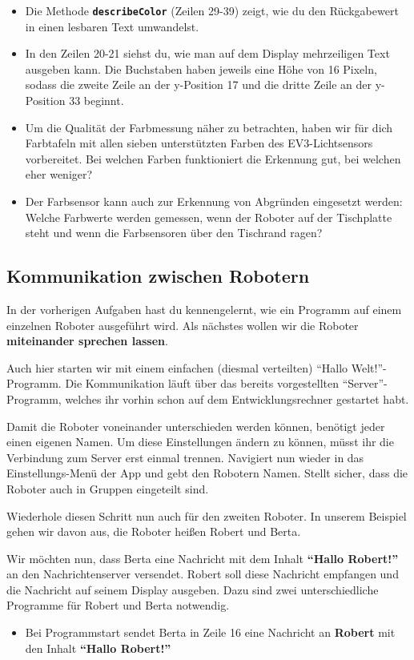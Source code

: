 \documentclass[
	12pt,
	colorbacktitle,
	accentcolor=tud1c,
	draft,
	twoside,
	german
]{tudexercise}
\newcommand{\solpath}[0]{../../impl/androidApp/app/src/main/java/org/mindroid/android/app/programs/workshop/solutions}
\newcommand{\bfcode}[1]{\texttt{\textbf{#1}}}
\begin{document}
	
	
	\begin{itemize}
	\item Die Methode \bfcode{describeColor} (Zeilen 29-39) zeigt, wie du den Rückgabewert in einen lesbaren Text umwandelst.
	\item In den Zeilen 20-21 siehst du, wie man auf dem Display mehrzeiligen Text ausgeben kann. Die Buchstaben haben jeweils eine Höhe von 16 Pixeln, sodass die zweite Zeile an der y-Position 17 und die dritte Zeile an der y-Position 33 beginnt.
	\item Um die Qualität der Farbmessung näher zu betrachten, haben wir für dich Farbtafeln mit allen sieben unterstützten Farben des EV3-Lichtsensors vorbereitet. Bei welchen Farben funktioniert die Erkennung gut, bei welchen eher weniger?
	\item Der Farbsensor kann auch zur Erkennung von Abgründen eingesetzt werden: Welche Farbwerte werden gemessen, wenn der Roboter auf der Tischplatte steht und wenn die Farbsensoren über den Tischrand ragen?
	\end{itemize}
	
	\subsection{Kommunikation zwischen Robotern} %
	In der vorherigen Aufgaben hast du kennengelernt, wie ein Programm auf einem einzelnen Roboter ausgeführt wird. Als nächstes wollen wir die Roboter \textbf{miteinander sprechen lassen}.
	
	Auch hier starten wir mit einem einfachen (diesmal verteilten) “Hallo Welt!”-Programm. Die Kommunikation läuft über das bereits vorgestellten “Server”-Programm, welches ihr vorhin schon auf dem Entwicklungsrechner gestartet habt. 
	
	Damit die Roboter voneinander unterschieden werden können, benötigt jeder einen eigenen Namen. Um diese Einstellungen ändern zu können, müsst ihr die Verbindung zum Server erst einmal trennen. Navigiert nun wieder in das Einstellungs-Menü der App und gebt den Robotern Namen. Stellt sicher, dass die Roboter auch in Gruppen eingeteilt sind. 
	
	Wiederhole diesen Schritt nun auch für den zweiten Roboter. In unserem Beispiel gehen wir davon aus, die Roboter heißen Robert und Berta.
	
	Wir möchten nun, dass Berta eine Nachricht mit dem Inhalt \textbf{``Hallo Robert!''} an den Nachrichtenserver versendet. Robert soll diese Nachricht empfangen und die Nachricht auf seinem Display ausgeben. 
	Dazu sind zwei unterschiedliche Programme für Robert und Berta notwendig.
	
	\begin{itemize}
	\item Bei Programmstart sendet Berta in Zeile 16 eine Nachricht an \textbf{Robert }mit den Inhalt \textbf{``Hallo Robert!''}
	\end{itemize}
	
\end{document}
